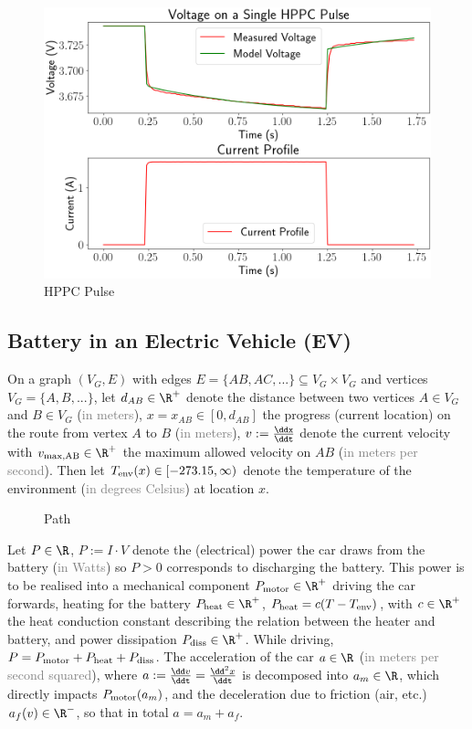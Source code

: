 \documentclass[12pt, a4paper]{article}
\begin{document}
  \begin{figure}[H]
    \centering
    \includegraphics[width=0.6\linewidth]{figures/hppc-pulse.png}
    \caption{HPPC Pulse}
    \label{fig:hppc-pulse}
  \end{figure}

  \subsection{Battery in an Electric Vehicle (EV)}
  On a graph $(V_G, E)$ with edges $E = \{AB, AC, ...\} \subseteq V_G \times V_G$ and vertices $V_G = \{A, B, ...\}$, let
  $d_{AB} \in \R^+$ denote the distance between two vertices $A \in V_G$ and $B \in V_G$ (\textcolor{gray}{in meters}),
  $x = x_{AB} \in [0, d_{AB}]$ the progress (current location) on the route from vertex $A$ to $B$ (\textcolor{gray}{in meters}),
  $v := \frac{\ddx}{\ddt}$ denote the current velocity with
  $v_{\rm max, AB} \in \R^+$ the maximum allowed velocity on $AB$ (\textcolor{gray}{in meters per second}).
  Then let
  $T_{\rm env}(x) \in [-273.15, \infty)$ denote the temperature of the environment (\textcolor{gray}{in degrees Celsius}) at location $x$.

  \begin{figure}[H]
    \centering
    \caption{Path}
  \end{figure}

  Let $P \in \R$, $P := I \cdot V$ denote the (electrical) power the car draws from the battery (\textcolor{gray}{in Watts}) so $P > 0$ corresponds to discharging the battery.
  This power is to be realised into a mechanical component $P_{\rm motor} \in \R^+$ driving the car forwards, heating for the battery $P_{\rm heat} \in \R^+$, $P_{\rm heat} = c (T - T_{\rm env})$, with $c \in \R^+$ the heat conduction constant describing the relation between the heater and battery, and power dissipation $P_{\rm diss} \in \R^+$.
  While driving, $P = P_{\rm motor} + P_{\rm heat} + P_{\rm diss}$.
  The acceleration of the car $a \in \R$ (\textcolor{gray}{in meters per second squared}), where $a := \frac{\dd v}{\ddt} = \frac{\dd^2 x}{\ddt}$ is decomposed into $a_m \in \R$, which directly impacts $P_{\rm motor}(a_m)$, and the deceleration due to friction (air, etc.) $a_f(v) \in \R^-$, so that in total $a = a_m + a_f$.
\end{document}
